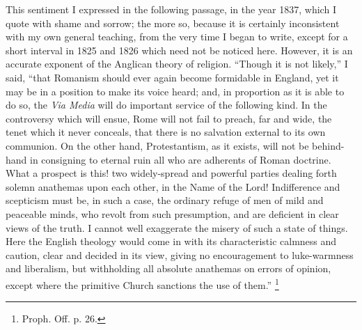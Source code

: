 This sentiment I expressed in the following passage, in the year
1837, which I quote with shame and sorrow; the more so, because it is
certainly inconsistent with my own general teaching, from the very
time I began to write, except for a short interval in 1825 and 1826
which need not be noticed here. However, it is an accurate exponent of
the Anglican theory of religion. ``Though it is not likely,''
I said, ``that Romanism should ever again become formidable in
England, yet it may be in a position to make its voice heard; and, in
proportion as it is able to do so, the \emph{Via Media} will do
important service of the following kind. In the controversy which will
ensue, Rome will not fail to preach, far and wide, the tenet which it
never conceals, that there is no salvation external to its own
communion. On the other hand, Protestantism, as it exists, will not be
behind-hand in consigning to eternal ruin all who are adherents of
Roman doctrine. What a prospect is this! two widely-spread and
powerful parties dealing forth solemn anathemas upon each other, in
the Name of the Lord! Indifference and scepticism must be, in such a
case, the ordinary refuge of men of mild and peaceable minds, who
revolt from such presumption, and are deficient in clear views of the
truth. I cannot well exaggerate the misery of such a state of things.
Here the English theology would come in with its characteristic
calmness and caution, clear and decided in its view, giving no
encouragement to luke-warmness and liberalism, but withholding all
absolute anathemas on errors of opinion, except where the primitive
Church sanctions the use of them.'' \footnote{Proph. Off. p. 26.}


